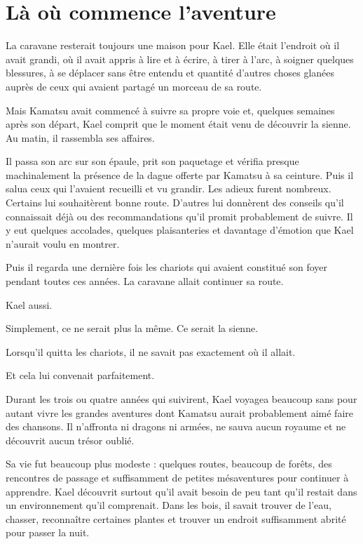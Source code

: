 \chapter{Là où commence l'aventure}
\label{chap:commence-aventure}

La caravane resterait toujours une maison pour Kael. Elle était l'endroit où il
avait grandi, où il avait appris à lire et à écrire, à tirer à l'arc, à soigner
quelques blessures, à se déplacer sans être entendu et quantité d'autres choses
glanées auprès de ceux qui avaient partagé un morceau de sa route.

Mais Kamatsu avait commencé à suivre sa propre voie et, quelques semaines
après son départ, Kael comprit que le moment était venu de découvrir la sienne.
Au matin, il rassembla ses affaires.

Il passa son arc sur son épaule, prit son paquetage et vérifia presque
machinalement la présence de la dague offerte par Kamatsu à sa ceinture. Puis
il salua ceux qui l'avaient recueilli et vu grandir. Les adieux furent
nombreux. Certains lui souhaitèrent bonne route. D'autres lui donnèrent des
conseils qu'il connaissait déjà ou des recommandations qu'il promit
probablement de suivre. Il y eut quelques accolades, quelques plaisanteries et
davantage d'émotion que Kael n'aurait voulu en montrer.

Puis il regarda une dernière fois les chariots qui avaient constitué son foyer
pendant toutes ces années. La caravane allait continuer sa route.

Kael aussi.

Simplement, ce ne serait plus la même. Ce serait la sienne.

Lorsqu'il quitta les chariots, il ne savait pas exactement où il allait.

Et cela lui convenait parfaitement.

\scenebreak

Durant les trois ou quatre années qui suivirent, Kael voyagea beaucoup sans pour
autant vivre les grandes aventures dont Kamatsu aurait probablement aimé faire
des chansons. Il n'affronta ni dragons ni armées, ne sauva aucun royaume et ne
découvrit aucun trésor oublié.

Sa vie fut beaucoup plus modeste : quelques routes, beaucoup de forêts, des
rencontres de passage et suffisamment de petites mésaventures pour continuer à
apprendre. Kael découvrit surtout qu'il avait besoin de peu tant qu'il restait
dans un environnement qu'il comprenait. Dans les bois, il savait trouver de
l'eau, chasser, reconnaître certaines plantes et trouver un endroit
suffisamment abrité pour passer la nuit.

